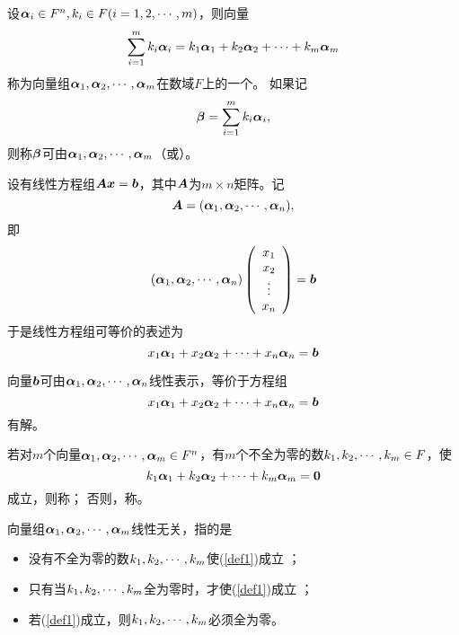 \begin{frame}
\begin{dingyi}[线性表示]
  设$\boldsymbol{\alpha}_i\in F^n, k_i \in F (i=1,2,\cdots,m)$，则向量
  $$
  \sum_{i=1}^m k_i\boldsymbol{\alpha}_i = k_1\boldsymbol{\alpha}_1 + k_2\boldsymbol{\alpha}_2+\cdots + k_m\boldsymbol{\alpha}_m
  $$
  称为向量组$\boldsymbol{\alpha}_1,\boldsymbol{\alpha}_2,\cdots,\boldsymbol{\alpha}_m$在数域$F$上的一个。  如果记
  $$\boldsymbol{\beta}=\sum_{i=1}^m k_i\boldsymbol{\alpha}_i,$$
  则称$\boldsymbol{\beta}$可由$\boldsymbol{\alpha}_1,\boldsymbol{\alpha}_2,\cdots,\boldsymbol{\alpha}_m$（或）。
\end{dingyi}
\end{frame}

\begin{frame}
设有线性方程组$\boldsymbol{A}{\boldsymbol{x}}={\boldsymbol{b}}$，其中$\boldsymbol{A}$为$m\times n$矩阵。记
$$\boldsymbol{A}=(\boldsymbol{\alpha}_1,\boldsymbol{\alpha}_2,\cdots,\boldsymbol{\alpha}_n),$$
即
$$
(\boldsymbol{\alpha}_1,\boldsymbol{\alpha}_2,\cdots,\boldsymbol{\alpha}_n) \left(
\begin{array}{c}
  x_1\\
  x_2\\
  \vdots\\
  x_n
\end{array}
\right)={\boldsymbol{b}}
$$
于是线性方程组可等价的表述为
$$
x_1\boldsymbol{\alpha}_1+x_2\boldsymbol{\alpha}_2+\cdots+x_n\boldsymbol{\alpha}_n={\boldsymbol{b}}
$$
\end{frame}

\begin{frame}
\begin{zhu}
  向量${\boldsymbol{b}}$可由$\boldsymbol{\alpha}_1,\boldsymbol{\alpha}_2,\cdots,\boldsymbol{\alpha}_n$线性表示，等价于方程组
  $$
  x_1\boldsymbol{\alpha}_1+x_2\boldsymbol{\alpha}_2+\cdots+x_n\boldsymbol{\alpha}_n={\boldsymbol{b}}
  $$
  有解。
\end{zhu}
\end{frame}

\begin{frame}
\begin{dingyi}[线性相关与线性无关]
  若对$m$个向量$\boldsymbol{\alpha}_1,\boldsymbol{\alpha}_2,\cdots,\boldsymbol{\alpha}_m\in F^n$，有$m$个不全为零的数$k_1,k_2,\cdots,k_m\in F$，使
  \begin{equation}\label{def1}
    k_1\alphabd_1 + k_2\alphabd_2+\cd + k_m\alphabd_m = \M0        
  \end{equation}
  成立，则称；
  否则，称。
\end{dingyi}
\end{frame}

\begin{frame}
\begin{zhu}
  向量组$\boldsymbol{\alpha}_1,\boldsymbol{\alpha}_2,\cdots,\boldsymbol{\alpha}_m$线性无关，指的是
  \begin{itemize}
  \item 没有不全为零的数$k_1,k_2,\cdots,k_m$使(\ref{def1})成立 ；
  \item 只有当$k_1,k_2,\cdots,k_m$全为零时，才使(\ref{def1})成立 ；
  \item 若(\ref{def1})成立，则$k_1,k_2,\cdots,k_m$必须全为零。
  \end{itemize}
\end{zhu}
\end{frame}


